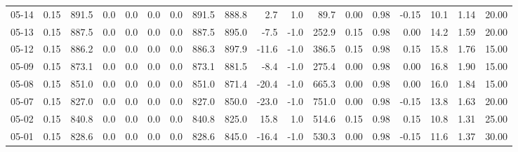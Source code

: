 \begin{threeparttable}
{\begin{tabular}{lrrrrrrrrrrrrrrrrr}
  05-14 &     0.15 & 891.5 &               0.0 &               0.0 &                0.0 &                0.0 & 891.5 & 888.8 &        2.7 &                      1.0 &                89.7 &       0.00 &      0.98 &          -0.15 &             10.1 &            1.14 &                  20.00 \\
  05-13 &     0.15 & 887.5 &               0.0 &               0.0 &                0.0 &                0.0 & 887.5 & 895.0 &       -7.5 &                     -1.0 &               252.9 &       0.15 &      0.98 &           0.00 &             14.2 &            1.59 &                  20.00 \\
  05-12 &     0.15 & 886.2 &               0.0 &               0.0 &                0.0 &                0.0 & 886.3 & 897.9 &      -11.6 &                     -1.0 &               386.5 &       0.15 &      0.98 &           0.15 &             15.8 &            1.76 &                  15.00 \\
  05-09 &     0.15 & 873.1 &               0.0 &               0.0 &                0.0 &                0.0 & 873.1 & 881.5 &       -8.4 &                     -1.0 &               275.4 &       0.00 &      0.98 &           0.00 &             16.8 &            1.90 &                  15.00 \\
  05-08 &     0.15 & 851.0 &               0.0 &               0.0 &                0.0 &                0.0 & 851.0 & 871.4 &      -20.4 &                     -1.0 &               665.3 &       0.00 &      0.98 &           0.00 &             16.0 &            1.84 &                  15.00 \\
  05-07 &     0.15 & 827.0 &               0.0 &               0.0 &                0.0 &                0.0 & 827.0 & 850.0 &      -23.0 &                     -1.0 &               751.0 &       0.00 &      0.98 &          -0.15 &             13.8 &            1.63 &                  20.00 \\
  05-02 &     0.15 & 840.8 &               0.0 &               0.0 &                0.0 &                0.0 & 840.8 & 825.0 &       15.8 &                      1.0 &               514.6 &       0.15 &      0.98 &           0.15 &             10.8 &            1.31 &                  25.00 \\
  05-01 &     0.15 & 828.6 &               0.0 &               0.0 &                0.0 &                0.0 & 828.6 & 845.0 &      -16.4 &                     -1.0 &               530.3 &       0.00 &      0.98 &          -0.15 &             11.6 &            1.37 &                  30.00 \\

\end{tabular}}
\end{threeparttable}
